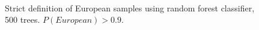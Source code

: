 \documentclass[12pt]{article}
\begin{document}
\begin{figure}
\centering
{}
\\
\caption{Strict definition of European samples using random forest classifier, 500 trees. $P(European)>0.9$.}
\label{fig:PCA_1kg}
\end{figure}
\end{document}

